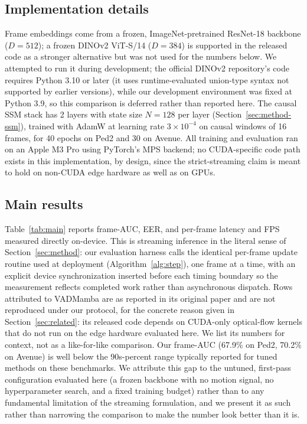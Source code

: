 \subsection{Implementation details}
Frame embeddings come from a frozen, ImageNet-pretrained ResNet-18 backbone ($D{=}512$); a frozen DINOv2 ViT-S/14 ($D{=}384$) is supported in the released code as a stronger alternative but was not used for the numbers below. We attempted to run it during development; the official DINOv2 repository's code requires Python 3.10 or later (it uses runtime-evaluated union-type syntax not supported by earlier versions), while our development environment was fixed at Python 3.9, so this comparison is deferred rather than reported here. The causal SSM stack has 2 layers with state size $N{=}128$ per layer (Section~\ref{sec:method-ssm}), trained with AdamW at learning rate $3\times10^{-4}$ on causal windows of 16 frames, for 40 epochs on Ped2 and 30 on Avenue. All training and evaluation ran on an Apple M3 Pro using PyTorch's MPS backend; no CUDA-specific code path exists in this implementation, by design, since the strict-streaming claim is meant to hold on non-CUDA edge hardware as well as on GPUs.

\subsection{Main results}
Table~\ref{tab:main} reports frame-AUC, EER, and per-frame latency and FPS measured directly on-device. This is streaming inference in the literal sense of Section~\ref{sec:method}: our evaluation harness calls the identical per-frame update routine used at deployment (Algorithm~\ref{alg:step}), one frame at a time, with an explicit device synchronization inserted before each timing boundary so the measurement reflects completed work rather than asynchronous dispatch. Rows attributed to VADMamba are as reported in its original paper and are not reproduced under our protocol, for the concrete reason given in Section~\ref{sec:related}: its released code depends on CUDA-only optical-flow kernels that do not run on the edge hardware evaluated here. We list its numbers for context, not as a like-for-like comparison. Our frame-AUC (67.9\% on Ped2, 70.2\% on Avenue) is well below the 90s-percent range typically reported for tuned methods on these benchmarks. We attribute this gap to the untuned, first-pass configuration evaluated here (a frozen backbone with no motion signal, no hyperparameter search, and a fixed training budget) rather than to any fundamental limitation of the streaming formulation, and we present it as such rather than narrowing the comparison to make the number look better than it is.

